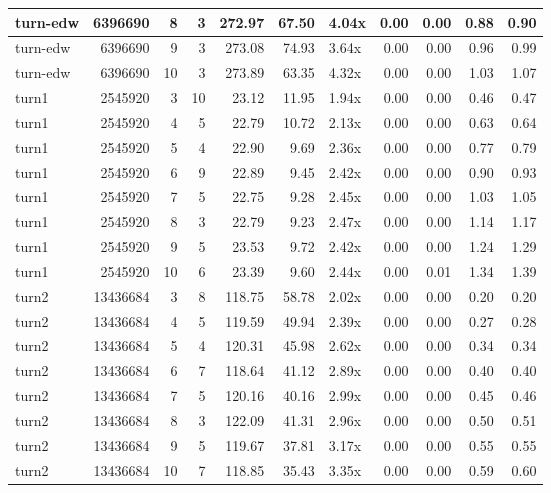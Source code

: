 \begin{table}[ht]
\begin{tabular}{lrrrrrlrrrr}
   \hline
turn-edw & 6396690 &   8 &   3 & 272.97 & 67.50 & 4.04x & 0.00 & 0.00 & 0.88 & 0.90 \\ 
   \hline
turn-edw & 6396690 &   9 &   3 & 273.08 & 74.93 & 3.64x & 0.00 & 0.00 & 0.96 & 0.99 \\ 
   \hline
turn-edw & 6396690 &  10 &   3 & 273.89 & 63.35 & 4.32x & 0.00 & 0.00 & 1.03 & 1.07 \\ 
   \hline
turn1 & 2545920 &   3 &  10 & 23.12 & 11.95 & 1.94x & 0.00 & 0.00 & 0.46 & 0.47 \\ 
   \hline
turn1 & 2545920 &   4 &   5 & 22.79 & 10.72 & 2.13x & 0.00 & 0.00 & 0.63 & 0.64 \\ 
   \hline
turn1 & 2545920 &   5 &   4 & 22.90 & 9.69 & 2.36x & 0.00 & 0.00 & 0.77 & 0.79 \\ 
   \hline
turn1 & 2545920 &   6 &   9 & 22.89 & 9.45 & 2.42x & 0.00 & 0.00 & 0.90 & 0.93 \\ 
   \hline
turn1 & 2545920 &   7 &   5 & 22.75 & 9.28 & 2.45x & 0.00 & 0.00 & 1.03 & 1.05 \\ 
   \hline
turn1 & 2545920 &   8 &   3 & 22.79 & 9.23 & 2.47x & 0.00 & 0.00 & 1.14 & 1.17 \\ 
   \hline
turn1 & 2545920 &   9 &   5 & 23.53 & 9.72 & 2.42x & 0.00 & 0.00 & 1.24 & 1.29 \\ 
   \hline
turn1 & 2545920 &  10 &   6 & 23.39 & 9.60 & 2.44x & 0.00 & 0.01 & 1.34 & 1.39 \\ 
   \hline
turn2 & 13436684 &   3 &   8 & 118.75 & 58.78 & 2.02x & 0.00 & 0.00 & 0.20 & 0.20 \\ 
   \hline
turn2 & 13436684 &   4 &   5 & 119.59 & 49.94 & 2.39x & 0.00 & 0.00 & 0.27 & 0.28 \\ 
   \hline
turn2 & 13436684 &   5 &   4 & 120.31 & 45.98 & 2.62x & 0.00 & 0.00 & 0.34 & 0.34 \\ 
   \hline
turn2 & 13436684 &   6 &   7 & 118.64 & 41.12 & 2.89x & 0.00 & 0.00 & 0.40 & 0.40 \\ 
   \hline
turn2 & 13436684 &   7 &   5 & 120.16 & 40.16 & 2.99x & 0.00 & 0.00 & 0.45 & 0.46 \\ 
   \hline
turn2 & 13436684 &   8 &   3 & 122.09 & 41.31 & 2.96x & 0.00 & 0.00 & 0.50 & 0.51 \\ 
   \hline
turn2 & 13436684 &   9 &   5 & 119.67 & 37.81 & 3.17x & 0.00 & 0.00 & 0.55 & 0.55 \\ 
   \hline
turn2 & 13436684 &  10 &   7 & 118.85 & 35.43 & 3.35x & 0.00 & 0.00 & 0.59 & 0.60 \\ 
   \hline
\end{tabular}
\end{table}
